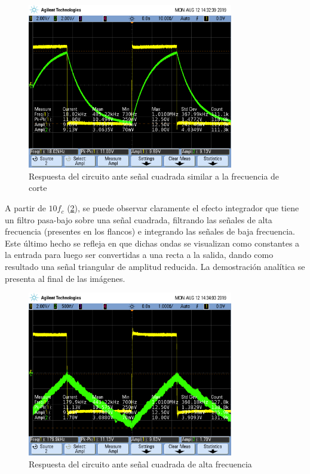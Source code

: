 \documentclass[11pt, a4paper]{article}
\begin{document}
\begin{figure}[H]
	\centering
	\includegraphics[width=0.8\textwidth,trim={0.5cm 5cm  1 5cm},clip]{rta_onda_cuadrada_fc.png}
	\caption{Respuesta del circuito ante señal cuadrada similar a la frecuencia de corte} 
	\label{graf:rta_onda_cuadrada_fc}
\end{figure}

 A partir de $10f_c$ (\ref{graf:rta_onda_cuadrada_alta_f}), se puede observar claramente el efecto integrador que tiene un filtro pasa-bajo sobre una señal cuadrada, filtrando las señales de alta frecuencia (presentes en los flancos) e integrando las señales de baja frecuencia. Este último hecho se refleja en que dichas ondas se visualizan como constantes a la entrada para luego ser convertidas a una recta a la salida, dando como resultado una señal triangular de amplitud reducida. La demostración analítica se presenta al final de las imágenes.
 
\begin{figure}[H]
	\centering
	\includegraphics[width=0.8\textwidth,trim={0.5cm 5cm  1 5cm},clip]{rta_onda_cuadrada_alta_f.png}
	\caption{Respuesta del circuito ante señal cuadrada de alta frecuencia} 
	\label{graf:rta_onda_cuadrada_alta_f}
\end{figure}
\end{document}
